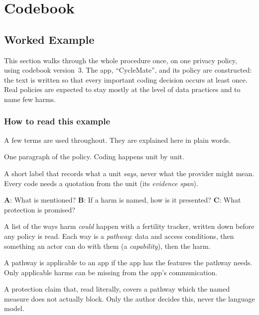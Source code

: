 \chapter{Codebook}
\label{app:codebook}

\section{Worked Example}
\label{app:worked-example}

This section walks through the whole procedure once, on one privacy policy,
using codebook version~3. The app, \enquote{CycleMate}, and its policy are
constructed: the text is written so that every important coding decision
occurs at least once. Real policies are expected to stay mostly at the level
of data practices and to name few harms.

\subsection*{How to read this example}

A few terms are used throughout. They are explained here in plain words.

\begin{description}[leftmargin=0pt,itemsep=2pt]
  \item[Unit.] One paragraph of the policy. Coding happens unit by unit.
  \item[Code.] A short label that records what a unit \emph{says}, never what
    the provider might mean. Every code needs a quotation from the unit
    (its \emph{evidence span}).
  \item[Three questions (axes).] \textbf{A}: What is mentioned? \textbf{B}: If
    a harm is named, how is it presented? \textbf{C}: What protection is
    promised?
  \item[Reference tree.] A list of the ways harm \emph{could} happen with a
    fertility tracker, written down before any policy is read. Each way is a
    \emph{pathway}: data and access conditions, then something an actor
    can do with them (a \emph{capability}), then the harm.
  \item[Applicable.] A pathway is applicable to an app if the app has the
    features the pathway needs. Only applicable harms can be missing from the
    app's communication.
  \item[Potential mismatch.] A protection claim that, read literally, covers
    a pathway which the named measure does not actually block. Only the author
    decides this, never the language model.
\end{description}

